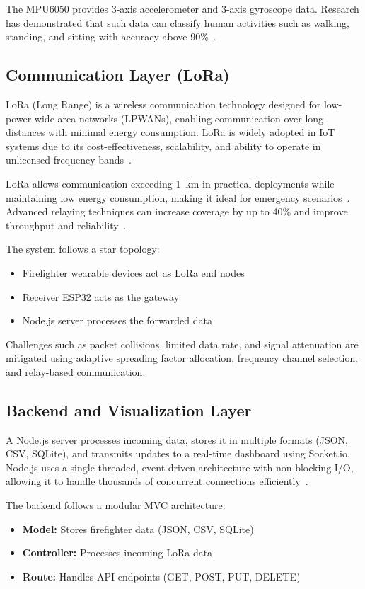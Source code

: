 \documentclass[conference]{IEEEtran}
\begin{document}
	The MPU6050 provides 3-axis accelerometer and 3-axis gyroscope data. Research
	has demonstrated that such data can classify human activities such as walking,
	standing, and sitting with accuracy above 90\%~\cite{doddabasappla2021}.
	
	\subsection{Communication Layer (LoRa)}
	
	LoRa (Long Range) is a wireless communication technology designed for
	low-power wide-area networks (LPWANs), enabling communication over long
	distances with minimal energy consumption. LoRa is widely adopted in IoT
	systems due to its cost-effectiveness, scalability, and ability to operate in
	unlicensed frequency bands~\cite{haif2024}.
	
	LoRa allows communication exceeding 1~km in practical deployments while
	maintaining low energy consumption, making it ideal for emergency
	scenarios~\cite{obrien2025}. Advanced relaying techniques can increase coverage
	by up to 40\% and improve throughput and reliability~\cite{haif2024}.
	
	The system follows a star topology:
	\begin{itemize}
		\item Firefighter wearable devices act as LoRa end nodes
		\item Receiver ESP32 acts as the gateway
		\item Node.js server processes the forwarded data
	\end{itemize}
	
	Challenges such as packet collisions, limited data rate, and signal attenuation
	are mitigated using adaptive spreading factor allocation, frequency channel
	selection, and relay-based communication.
	
	\subsection{Backend and Visualization Layer}
	
	A Node.js server processes incoming data, stores it in multiple formats (JSON,
	CSV, SQLite), and transmits updates to a real-time dashboard using Socket.io.
	Node.js uses a single-threaded, event-driven architecture with non-blocking I/O,
	allowing it to handle thousands of concurrent connections
	efficiently~\cite{huang2020}.
	
	The backend follows a modular MVC architecture:
	\begin{itemize}
		\item \textbf{Model:} Stores firefighter data (JSON, CSV, SQLite)
		\item \textbf{Controller:} Processes incoming LoRa data
		\item \textbf{Route:} Handles API endpoints (GET, POST, PUT, DELETE)
	\end{itemize}
	
\end{document}
